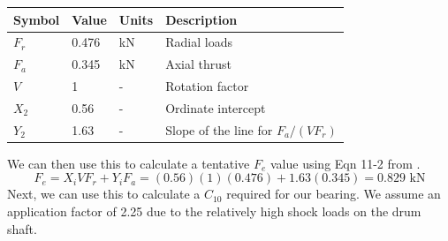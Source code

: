 \documentclass[letterpaper,12pt]{article}
\begin{document}
\begin{center}
\begin{tabular}{ |p{1.5cm}||p{1.2cm}|p{2cm}|p{7cm}|  }
		\hline
		Symbol & Value & Units & Description\\
		\hline
		$F _ { r }$ & 0.476 & kN & Radial loads\\
        $F _ { a }$ & 0.345 & kN  & Axial thrust \\			
	    $V$ & 1 & -  & Rotation factor\\
	    $X _ { 2 }$ & 0.56 & -  &  Ordinate intercept \\
	    $Y _ { 2 }$ &1.63 & -  &  Slope of the line for $F _ { a } / \left( V F _ { r } \right)$\\
	    
	    \hline
\end{tabular}
\end{center}

%	

We can then use this to calculate a tentative $F_e$ value using Eqn 11-2 from \cite{shigley}.
\begin{equation*}
F _ { e } = X _ { i } V F _ { r } + Y _ { i } F _ { a } = ( 0.56 ) ( 1 )( 0.476 ) + 1.63 ( 0.345 ) = 0.829 \text{ kN}
\end{equation*}
\noindent Next, we can use this to calculate a $C_{10}$ required for our bearing. We assume an application factor of 2.25 due to the relatively high shock loads on the drum shaft.
\end{document}

